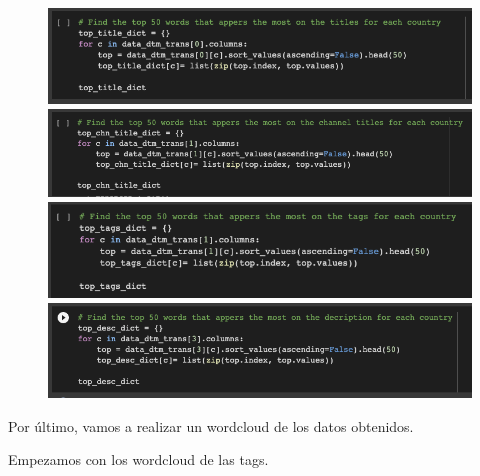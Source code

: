 \documentclass[a4paper,12pt]{article}
\begin{document}
\begin{figure}[h!]
\centering
\includegraphics[width=12cm]{50_words_title.png}
\includegraphics[width=12cm]{50_words_channel.png}
\includegraphics[width=12cm]{50_words_tags.png}
\includegraphics[width=12cm]{50_words_desc.png}
\end{figure}

Por \'ultimo, vamos a realizar un wordcloud de los datos obtenidos.

Empezamos con los wordcloud de las tags.
\end{document}
